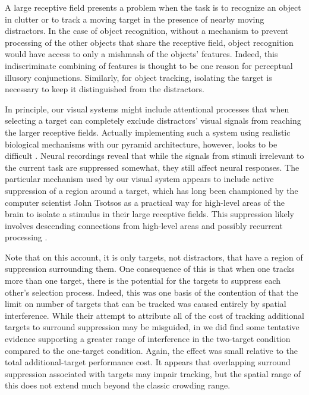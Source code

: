 \documentclass[
]{book}
\begin{document}
A large receptive field presents a problem when the task is to recognize an object in clutter or to track a moving target in the presence of nearby moving distractors. In the case of object recognition, without a mechanism to prevent processing of the other objects that share the receptive field, object recognition would have access to only a mishmash of the objects' features. Indeed, this indiscriminate combining of features is thought to be one reason for perceptual illusory conjunctions. Similarly, for object tracking, isolating the target is necessary to keep it distinguished from the distractors.

In principle, our visual systems might include attentional processes that when selecting a target can completely exclude distractors' visual signals from reaching the larger receptive fields. Actually implementing such a system using realistic biological mechanisms with our pyramid architecture, however, looks to be difficult \citep{tsotsosModelingVisualAttention1995}. Neural recordings reveal that while the signals from stimuli irrelevant to the current task are suppressed somewhat, they still affect neural responses. The particular mechanism used by our visual system appears to include active suppression of a region around a target, which has long been championed by the computer scientist John Tsotsos as a practical way for high-level areas of the brain to isolate a stimulus in their large receptive fields. This suppression likely involves descending connections from high-level areas and possibly recurrent processing \citep{tsotsosDifferentStagesVisual2008}.

Note that on this account, it is only targets, not distractors, that have a region of suppression surrounding them. One consequence of this is that when one tracks more than one target, there is the potential for the targets to suppress each other's selection process. Indeed, this was one basis of the contention of \citet{franconeriTrackingMultipleObjects2010a} that the limit on number of targets that can be tracked was caused entirely by spatial interference. While their attempt to attribute all of the cost of tracking additional targets to surround suppression may be misguided, in \citet{holcombeObjectTrackingAbsence2014} we did find some tentative evidence supporting a greater range of interference in the two-target condition compared to the one-target condition. Again, the effect was small relative to the total additional-target performance cost. It appears that overlapping surround suppression associated with targets may impair tracking, but the spatial range of this does not extend much beyond the classic crowding range.
\end{document}
